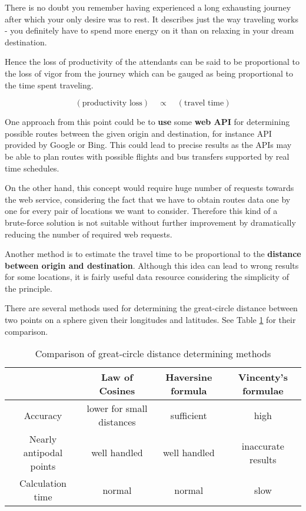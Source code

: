 There is no doubt you remember having experienced a long exhausting journey after which your only desire was to rest. It describes just the way traveling works - you definitely have to spend more energy on it than on relaxing in your dream destination.

Hence the loss of productivity of the attendants can be said to be proportional to the loss of vigor from the journey which can be gauged as being proportional to the time spent traveling.

$$(\text{productivity loss})\quad \propto\quad (\text{travel time})$$

One approach from this point could be to \textbf{use} some \textbf{web API} for determining possible routes between the given origin and destination, for instance API provided by Google or Bing. This could lead to precise results as the APIs may be able to plan routes with possible flights and bus transfers supported by real time schedules.

On the other hand, this concept would require huge number of requests towards the web service, considering the fact that we have to obtain routes data one by one for every pair of locations we want to consider. Therefore this kind of a brute-force solution is not suitable without further improvement by dramatically reducing the number of required web requests.

Another method is to estimate the travel time to be proportional to the \textbf{distance between origin and destination}. Although this idea can lead to wrong results for some locations, it is fairly useful data resource considering the simplicity of the principle.

There are several methods used for determining the great-circle distance between two points on a sphere given their longitudes and latitudes. See Table \ref{table:distance-methods} for their comparison.

\begin{table}[h!]
\centering \centering
\begin{tabular}{|c|c|c|c|}
\cline{2-4}
\multicolumn{1}{c|}{} & \textbf{Law of Cosines} & \textbf{Haversine formula} & \textbf{Vincenty's formulae} \\
\hline
Accuracy & lower for small distances & sufficient & high \\
\hline
Nearly antipodal points & well handled & well handled & inaccurate results \\
\hline
Calculation time & normal & normal & slow \\
\hline
\end{tabular}
\caption{Comparison of great-circle distance determining methods}
\label{table:distance-methods}
\end{table}

